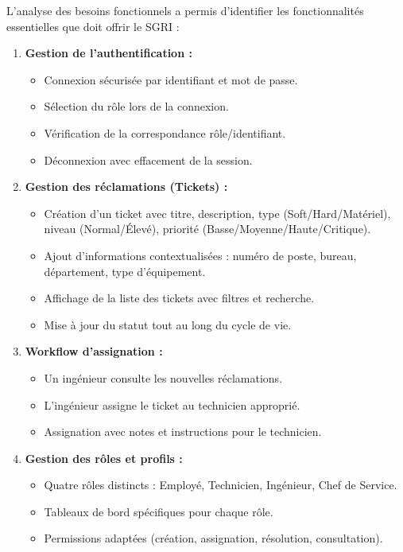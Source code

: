 \documentclass[12pt,a4paper,twoside]{report}
\begin{document}
L'analyse des besoins fonctionnels a permis d'identifier les fonctionnalités essentielles que doit offrir le SGRI :

\begin{enumerate}
    \item \textbf{Gestion de l'authentification :}
    \begin{itemize}
        \item Connexion sécurisée par identifiant et mot de passe.
        \item Sélection du rôle lors de la connexion.
        \item Vérification de la correspondance rôle/identifiant.
        \item Déconnexion avec effacement de la session.
    \end{itemize}
    
    \item \textbf{Gestion des réclamations (Tickets) :}
    \begin{itemize}
        \item Création d'un ticket avec titre, description, type (Soft/Hard/Matériel), niveau (Normal/Élevé), priorité (Basse/Moyenne/Haute/Critique).
        \item Ajout d'informations contextualisées : numéro de poste, bureau, département, type d'équipement.
        \item Affichage de la liste des tickets avec filtres et recherche.
        \item Mise à jour du statut tout au long du cycle de vie.
    \end{itemize}
    
    \item \textbf{Workflow d'assignation :}
    \begin{itemize}
        \item Un ingénieur consulte les nouvelles réclamations.
        \item L'ingénieur assigne le ticket au technicien approprié.
        \item Assignation avec notes et instructions pour le technicien.
    \end{itemize}
    
    \item \textbf{Gestion des rôles et profils :}
    \begin{itemize}
        \item Quatre rôles distincts : Employé, Technicien, Ingénieur, Chef de Service.
        \item Tableaux de bord spécifiques pour chaque rôle.
        \item Permissions adaptées (création, assignation, résolution, consultation).
    \end{itemize}
    

\end{enumerate}
\end{document}
